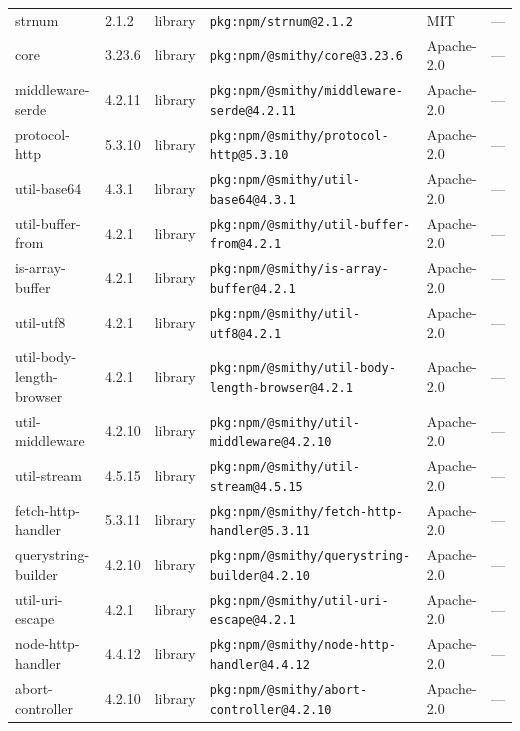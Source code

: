 \documentclass[11pt,a4paper]{article}
\begin{document}
\begin{longtable}{|p{4cm}|p{2cm}|p{1.6cm}|p{5cm}|p{1.5cm}|p{3.5cm}|}
\raggedright strnum & 2.1.2 & library & \small\texttt{pkg:npm/strnum@2.1.2} & MIT & \small — \\
\raggedright core & 3.23.6 & library & \small\texttt{pkg:npm/@smithy/core@3.23.6} & Apache-2.0 & \small — \\
\raggedright middleware-serde & 4.2.11 & library & \small\texttt{pkg:npm/@smithy/middleware-serde@4.2.11} & Apache-2.0 & \small — \\
\raggedright protocol-http & 5.3.10 & library & \small\texttt{pkg:npm/@smithy/protocol-http@5.3.10} & Apache-2.0 & \small — \\
\raggedright util-base64 & 4.3.1 & library & \small\texttt{pkg:npm/@smithy/util-base64@4.3.1} & Apache-2.0 & \small — \\
\raggedright util-buffer-from & 4.2.1 & library & \small\texttt{pkg:npm/@smithy/util-buffer-from@4.2.1} & Apache-2.0 & \small — \\
\raggedright is-array-buffer & 4.2.1 & library & \small\texttt{pkg:npm/@smithy/is-array-buffer@4.2.1} & Apache-2.0 & \small — \\
\raggedright util-utf8 & 4.2.1 & library & \small\texttt{pkg:npm/@smithy/util-utf8@4.2.1} & Apache-2.0 & \small — \\
\raggedright util-body-length-browser & 4.2.1 & library & \small\texttt{pkg:npm/@smithy/util-body-length-browser@4.2.1} & Apache-2.0 & \small — \\
\raggedright util-middleware & 4.2.10 & library & \small\texttt{pkg:npm/@smithy/util-middleware@4.2.10} & Apache-2.0 & \small — \\
\raggedright util-stream & 4.5.15 & library & \small\texttt{pkg:npm/@smithy/util-stream@4.5.15} & Apache-2.0 & \small — \\
\raggedright fetch-http-handler & 5.3.11 & library & \small\texttt{pkg:npm/@smithy/fetch-http-handler@5.3.11} & Apache-2.0 & \small — \\
\raggedright querystring-builder & 4.2.10 & library & \small\texttt{pkg:npm/@smithy/querystring-builder@4.2.10} & Apache-2.0 & \small — \\
\raggedright util-uri-escape & 4.2.1 & library & \small\texttt{pkg:npm/@smithy/util-uri-escape@4.2.1} & Apache-2.0 & \small — \\
\raggedright node-http-handler & 4.4.12 & library & \small\texttt{pkg:npm/@smithy/node-http-handler@4.4.12} & Apache-2.0 & \small — \\
\raggedright abort-controller & 4.2.10 & library & \small\texttt{pkg:npm/@smithy/abort-controller@4.2.10} & Apache-2.0 & \small — \\

\end{longtable}
\end{document}

